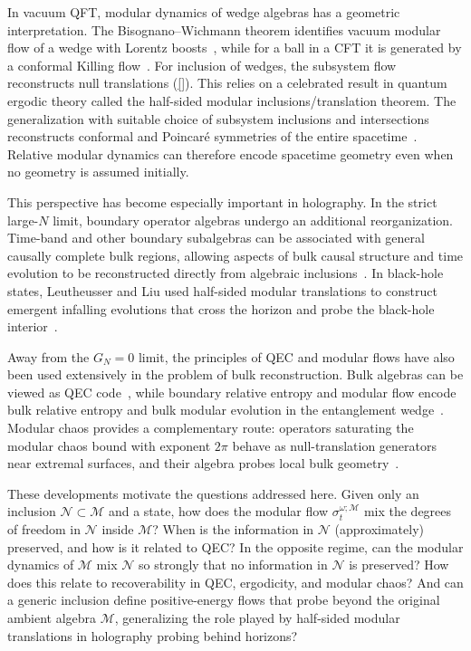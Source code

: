 \documentclass[a4paper,11pt]{article}
\theoremstyle{definition}
\newcommand{\mN}{\mathcal{N}}
\newcommand{\mM}{\mathcal{M}}
\begin{document}
In vacuum QFT, modular dynamics of wedge algebras has a geometric interpretation.  The Bisognano--Wichmann theorem identifies vacuum modular flow of a wedge with Lorentz boosts~\cite{BisognanoWichmann1975}, while for a ball in a CFT it is generated by a conformal Killing flow~\cite{CasiniHuertaMyers2011}. For inclusion of wedges, the subsystem flow reconstructs null translations (\ref{}). This relies on a celebrated result in quantum ergodic theory called the 
half-sided modular inclusions/translation theorem. The generalization with suitable choice of subsystem inclusions and intersections reconstructs conformal and Poincar\'e symmetries of the entire spacetime~\cite{Wiesbrock1993,Borchers1992,Wiesbrock1993b,GuidoLongoWiesbrock1998,ArakiZsido2005}.  Relative modular dynamics can therefore encode spacetime geometry even when no geometry is assumed initially. 

This perspective has become especially important in holography. In the strict large-$N$ limit, boundary operator algebras undergo an additional reorganization.  Time-band and other boundary subalgebras can be associated with general causally complete bulk regions, allowing aspects of bulk causal structure and time evolution to be reconstructed directly from algebraic inclusions~\cite{LeutheusserLiuSubregion}.  In black-hole states, Leutheusser and Liu used half-sided modular translations to construct emergent infalling evolutions that cross the horizon and probe the black-hole interior~\cite{LeutheusserLiuCausal,LeutheusserLiu2023}.

Away from the $G_N=0$ limit, the principles of QEC and modular flows have also been used extensively in the problem of bulk reconstruction. Bulk algebras can be viewed as QEC code~\cite{AlmheiriDongHarlow2015}, while boundary relative entropy and modular flow encode bulk relative entropy and bulk modular evolution in the entanglement wedge~\cite{JafferisLewkowyczMaldacenaSuh2016}.  Modular chaos provides a complementary route: operators saturating the modular chaos bound with exponent $2\pi$ behave as null-translation generators near extremal surfaces, and their algebra probes local bulk geometry~\cite{deBoerLamprou2020,faulkner2019modular}. 

These developments motivate the questions addressed here.  Given only an inclusion $\mN\subset\mM$ and a state, how does the modular flow $\sigma_t^{\omega;\mM}$ mix the degrees of freedom in $\mN$ inside $\mM$? When is the information in $\mN$ (approximately) preserved, and how is it related to QEC? In the opposite regime, can the modular dynamics of $\mM$ mix $\mN$ so strongly that no information in $\mN$ is preserved? How does this relate to recoverability in QEC, ergodicity, and modular chaos?  And can a generic inclusion define positive-energy flows that probe beyond the original ambient algebra $\mM$, generalizing the role played by half-sided modular translations in holography probing behind horizons?
\end{document}
